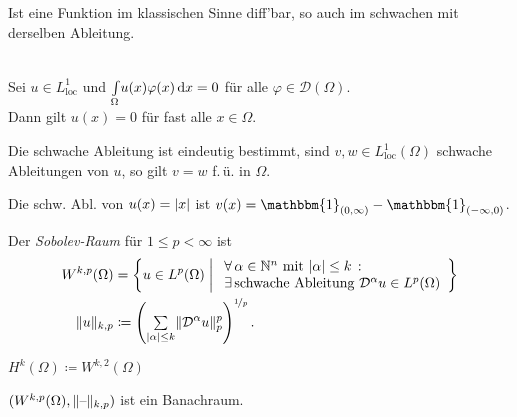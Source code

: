 \documentclass{cheat-sheet}
\newcommand{\DO}{\mathcal{D}} %
\newcommand{\loc}{\text{loc}} %
\newcommand{\ind}{\mathbbm{1}} %
\newcommand{\Testfun}{\mathcal{D}} %
\begin{document}
\begin{bem}
  Ist eine Funktion im klassischen Sinne diff'bar, so auch im schwachen mit derselben Ableitung.
\end{bem}

\begin{lem} \mbox{}\\
  Sei $u \in L^1_\loc$ und ${\textstyle \int\limits_{\Omega}^{}} u(x) \varphi(x) \,\mathrm{d} x = 0$ für alle $\varphi \in \Testfun(\Omega)$. \\
  Dann gilt $u(x) = 0$ für fast alle $x \in \Omega$.
\end{lem}

\begin{kor}
  Die schwache Ableitung ist eindeutig bestimmt, \dh{} sind $v, w \in L^1_\loc(\Omega)$ schwache Ableitungen von $u$, so gilt $v = w$ f.\,ü. in $\Omega$.
\end{kor}

\begin{bsp}
  Die schw. Abl. von $u(x) = \lvert x\rvert$ ist $v(x) = \ind_{\ointerval{0}{\infty}} - \ind_{\ointerval{- \infty}{0}}$.
\end{bsp}

\begin{lem}
  \inlineitem{$\DO^\alpha (u + \lambda v) = \DO^\alpha u + \lambda \DO^\alpha v$} \quad
  \inlineitem{$\DO^{\alpha + \beta} u = \DO^\alpha (\DO^\beta u)$}
\end{lem}

\begin{defn}
  Der \emph{Sobolev-Raum} für $1 \leq p < \infty$ ist
  \begin{align*}
    W^{k,p}(\Omega) & = \left\{ u \in L^p(\Omega) \;\middle|\; \begin{array}{l}
      \fa{\alpha \in \N^n \text{ mit } \abs{\alpha} \leq k} \\
      \exists \, \text{schwache Ableitung $\DO^\alpha u \in L^p(\Omega)$}
    \end{array} \right\} \\
    \norm{u}_{k,p} & \coloneqq \left( \sum_{\abs{\alpha} \leq k} \norm{\DO^\alpha u}_p^p \right)^{\nicefrac{1}{p}}.
  \end{align*}
\end{defn}

\begin{nota}
  $H^k(\Omega) \coloneqq W^{k,2}(\Omega)$
\end{nota}


\begin{satz}
  $(W^{k,p}(\Omega), \lVert\text{--}\rVert_{k,p})$ ist ein Banachraum.
\end{satz}
\end{document}
